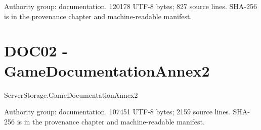 Authority group: documentation.\allowbreak{} 120178 UTF-8 bytes; 827 source lines.\allowbreak{} SHA-256 is in the provenance chapter and machine-readable manifest.\allowbreak{}

\begingroup{}
\endgroup
\chapter{DOC02 - GameDocumentationAnnex2}
\label{src:DOC02}
ServerStorage.\allowbreak{}GameDocumentationAnnex2

Authority group: documentation.\allowbreak{} 107451 UTF-8 bytes; 2159 source lines.\allowbreak{} SHA-256 is in the provenance chapter and machine-readable manifest.\allowbreak{}

\begingroup{}
\endgroup

